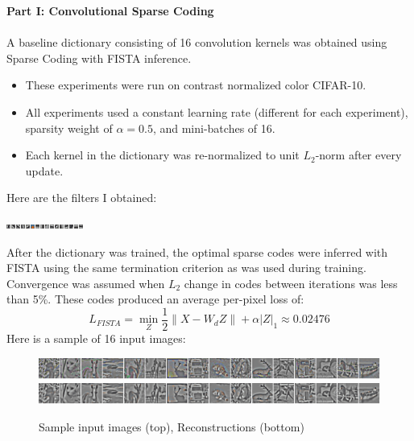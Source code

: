 \documentclass[12pt,a4paper]{report}
\begin{document}
\noindent
{\bf Part I: Convolutional Sparse Coding} \\ \\
A baseline dictionary consisting of 16 convolution kernels was obtained using Sparse Coding with FISTA inference.
\begin{itemize}
\item These experiments were run on contrast normalized color CIFAR-10.  
\item All experiments used a constant learning rate (different for each experiment), sparsity weight of $\alpha = 0.5$, and mini-batches of 16. 
\item Each kernel in the dictionary was re-normalized to unit $L_2$-norm after every update.   
\end{itemize}  
Here are the filters I obtained:
\begin{center}
\includegraphics[scale=4]{dec_SC1.png}
\end{center} 
After the dictionary was trained, the optimal sparse codes were inferred with FISTA using the same termination criterion as was used during training. Convergence was assumed when $L_2$ change in codes between iterations was less than 5\%.   
These codes produced an average per-pixel loss of: 
\begin{equation}
L_{FISTA} = \min_Z \frac{1}{2}\|X-W_dZ\| + \alpha |Z|_1 \approx 0.02476
\end{equation} 
Here is a sample of 16 input images: 

\begin{figure}[ht]
	\begin{center}
	\includegraphics[scale=0.75]{sample.png}
	\includegraphics[scale=0.75]{rec.png}
	\caption{Sample input images (top), Reconstructions (bottom)} 
	\end{center}
\end{figure} 
\end{document}
